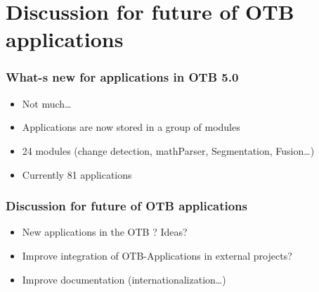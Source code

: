 \documentclass[8pt]{beamer}
\begin{document}
\section{Discussion for future of OTB applications}

\begin{frame}
\frametitle{What-s new for applications in OTB 5.0}
\begin{itemize}
\item Not much\ldots
\item Applications are now stored in a group of modules
\item 24 modules (change detection, mathParser, Segmentation, Fusion\ldots)
\item Currently 81 applications
\end{itemize}
\end{frame}

\begin{frame}
\frametitle{Discussion for future of OTB applications}
\begin{itemize}
\item New applications in the OTB ? Ideas?  
\item Improve integration of OTB-Applications in external projects?
\item Improve documentation (internationalization\ldots)
\end{itemize}
\end{frame}
\end{document}
